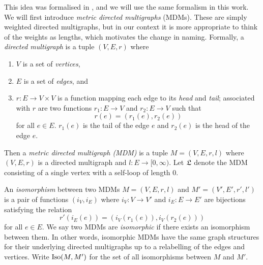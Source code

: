 This idea was formalised in \cite{goldschmidtScalingLimitCritical2019}, and we will use the same formalism in this work. We will first introduce \emph{metric directed multigraphs} (MDMs). These are simply weighted directed multigraphs, but in our context it is more appropriate to think of the weights as lengths, which motivates the change in naming. Formally, a \emph{directed multigraph} is a tuple $(V, E, r)$ where
\begin{enumerate}
    \item $V$ is a set of \emph{vertices},
    \item $E$ is a set of \emph{edges}, and
    \item $r: E \to V \times V$ is a function mapping each edge to its \emph{head} and \emph{tail}; associated with $r$ are two functions $r_1: E \to V$ and $r_2: E \to V$ such that
\begin{equation*}
    r(e) = (r_1(e), r_2(e))
\end{equation*}
for all $e \in E$. $r_1(e)$ is the tail of the edge $e$ and $r_2(e)$ is the head of the edge $e$.
\end{enumerate}
 Then a \emph{metric directed multigraph (MDM)} is a tuple $M = (V, E, r, l)$ where $(V, E, r)$ is a directed multigraph and $l:E \to [0, \infty)$. Let $\mathfrak L$ denote the MDM consisting of a single vertex with a self-loop of length 0.

An \emph{isomorphism} between two MDMs $M = (V, E, r, l)$ and $M' = (V', E', r', l')$ is a pair of functions $(i_V, i_E)$ where $i_V: V \to V'$ and $i_E: E \to E'$ are bijections satisfying the relation
\begin{equation*}
    r'(i_E(e)) = (i_V(r_1(e)), i_V(r_2(e)))
\end{equation*}
for all $e \in E$. We say two MDMs are \emph{isomorphic} if there exists an isomorphism between them. In other words, isomorphic MDMs have the same graph structures for their underlying directed multigraphs up to a relabelling of the edges and vertices. Write $\operatorname{Iso}(M, M')$ for the set of all isomorphisms between $M$ and $M'$.


